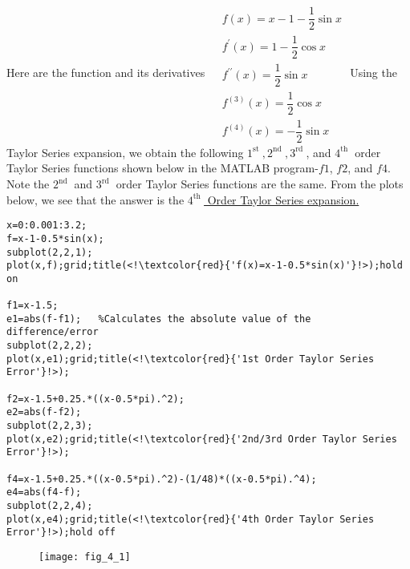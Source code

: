 \documentclass[../main.tex]{subfiles}
\begin{document}
\begin{enumerate}[label=\bfseries(\alph*)]
\section{}
Here are the function and its derivatives
\bigbreak$
\begin{aligned}
&f(x)=x-1-\dfrac{1}{2} \sin x \\
&f^{\prime}(x)=1-\dfrac{1}{2} \cos x \\
&f^{\prime \prime}(x)=\dfrac{1}{2} \sin x \\
&f^{(3)}(x)=\dfrac{1}{2} \cos x \\
&f^{(4)}(x)=-\dfrac{1}{2} \sin x
\end{aligned}$
\bigbreak
Using the Taylor Series expansion, we obtain the following $1^{\text {st }}, 2^{\text {nd }}, 3^{\text {rd }}$, and $4^{\text {th }}$ order Taylor Series functions shown below in the MATLAB program-$f1$, $f2$, and $f 4$. Note the $2^{\text {nd }}$ and $3^{\text {rd }}$ order Taylor Series functions are the same.
\bigbreak
From the plots below, we see that the answer is the \underline{$4^{\text {th }}$ Order Taylor Series expansion.}
\bigbreak
\begin{lstlisting}[numbers=none]
x=0:0.001:3.2;
f=x-1-0.5*sin(x);
subplot(2,2,1);
plot(x,f);grid;title(<!\textcolor{red}{'f(x)=x-1-0.5*sin(x)'}!>);hold on

f1=x-1.5;
e1=abs(f-f1);   %Calculates the absolute value of the
difference/error
subplot(2,2,2);
plot(x,e1);grid;title(<!\textcolor{red}{'1st Order Taylor Series Error'}!>);

f2=x-1.5+0.25.*((x-0.5*pi).^2);
e2=abs(f-f2);
subplot(2,2,3);
plot(x,e2);grid;title(<!\textcolor{red}{'2nd/3rd Order Taylor Series Error'}!>);

f4=x-1.5+0.25.*((x-0.5*pi).^2)-(1/48)*((x-0.5*pi).^4);
e4=abs(f4-f);
subplot(2,2,4);
plot(x,e4);grid;title(<!\textcolor{red}{'4th Order Taylor Series Error'}!>);hold off
\end{lstlisting}
\bigbreak
\begin{figure}[H]\quad\quad\quad\quad\quad\quad\quad\quad
		\texttt{[image: fig\_4\_1]}
		\label{fig:fig_4_1}
	\end{figure}
	\bigbreak

\end{enumerate}
\end{document}
